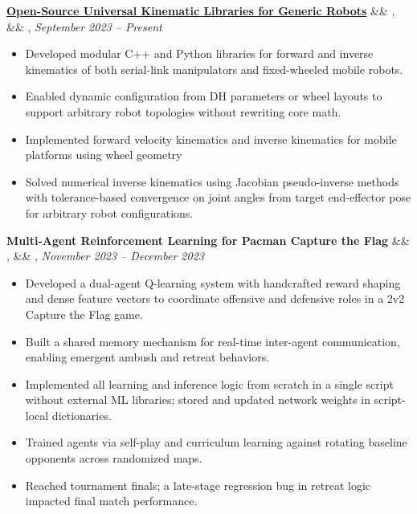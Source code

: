 \documentclass[letterpaper,10pt]{article}
\newcommand{\experience}[5]{%
    \noindent\textbf{#1}%
    \ifx&#2&
    \else
        , \textit{#2}%
    \fi
    \ifx&#3&
    \else
        , #3%
    \fi
    \hfill \textit{#4} \\
    \vspace{-6.8mm}%
    \begin{itemize}[itemsep=-5pt]
        \setlength{\itemindent}{0em}
        #5
    \end{itemize}
    \vspace{1mm}
}
\begin{document}
\experience
    {\href{https://ryanbarry.me/projects/robotics/kinematics/}{Open-Source Universal Kinematic Libraries for Generic Robots}}
    {}
    {}
    {September 2023 – Present}
    {
        \item Developed modular C++ and Python libraries for forward and inverse kinematics of both serial-link manipulators and fixed-wheeled mobile robots.
        \item Enabled dynamic configuration from DH parameters or wheel layouts to support arbitrary robot topologies without rewriting core math.
        \item Implemented forward velocity kinematics and inverse kinematics for mobile platforms using wheel geometry
        \item Solved numerical inverse kinematics using Jacobian pseudo-inverse methods with tolerance-based convergence on joint angles from target end-effector pose for arbitrary robot configurations.
        
    }
    
\experience
    {Multi-Agent Reinforcement Learning for Pacman Capture the Flag}
    {}
    {}
    {November 2023 – December 2023}
    {
        \item Developed a dual-agent Q-learning system with handcrafted reward shaping and dense feature vectors to coordinate offensive and defensive roles in a 2v2 Capture the Flag game.
        \item Built a shared memory mechanism for real-time inter-agent communication, enabling emergent ambush and retreat behaviors.
        \item Implemented all learning and inference logic from scratch in a single script without external ML libraries; stored and updated network weights in script-local dictionaries.
        \item Trained agents via self-play and curriculum learning against rotating baseline opponents across randomized maps.
        \item Reached tournament finals; a late-stage regression bug in retreat logic impacted final match performance.
    }
\end{document}
